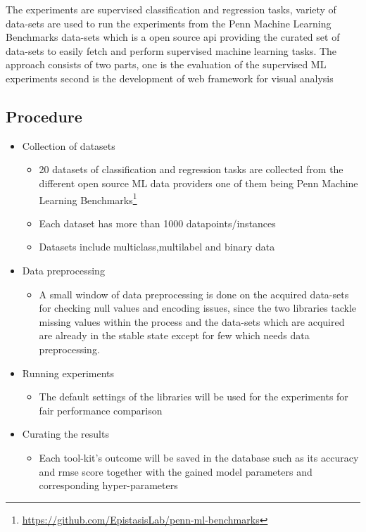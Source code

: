The experiments are supervised classification and regression tasks, variety of data-sets are used to run the experiments from the Penn Machine Learning Benchmarks\cite{plmb} data-sets which is a open source api providing the curated set of data-sets to easily fetch and perform supervised machine learning tasks. The approach consists of two parts, one is the evaluation of the supervised ML experiments second is the development of web framework for visual analysis

\subsection{Procedure}

\begin{itemize}
    \item Collection of datasets
\begin{itemize}
    \item 20 datasets of classification and regression tasks are collected from the different open source ML data providers one of them being Penn Machine Learning Benchmarks\footnote{\url{https://github.com/EpistasisLab/penn-ml-benchmarks}} 
    \item Each dataset has more than 1000 datapoints/instances 
    \item Datasets include multiclass,multilabel and binary data
\end{itemize}

    \item Data preprocessing 
    \begin{itemize}
        \item A small window of data preprocessing is done on the acquired data-sets for checking null values and encoding issues, since the two libraries tackle missing values within the process and the data-sets which are acquired are already in the stable state except for few which needs data preprocessing.
    \end{itemize}
    
    \item Running experiments
    \begin{itemize}
        \item The default settings of the libraries will be used for the experiments for fair performance comparison
    \end{itemize}
    
    \item Curating the results
    \begin{itemize}
        \item Each tool-kit's outcome will be saved in the database such as its accuracy and rmse score together with the gained model parameters and corresponding hyper-parameters
    \end{itemize}
    

\end{itemize}
